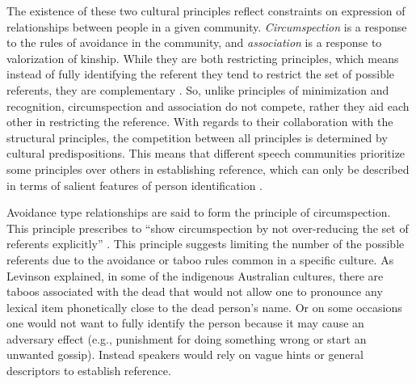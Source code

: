 \documentclass[12pt]{article}
\begin{document}
The existence of these two cultural principles reflect constraints on expression of relationships between people in a given community. \textit{Circumspection} is a response to the rules of avoidance in the community, and \textit{association} is a response to valorization of kinship. While they are both restricting principles, which means instead of fully identifying the referent they tend to restrict the set of possible referents, they are complementary \parencite{blythe2009}. So, unlike principles of minimization and recognition, circumspection and association do not compete, rather they aid each other in restricting the reference. With regards to their collaboration with the structural principles, the competition between all principles is determined by cultural predispositions. This means that different speech communities prioritize some principles over others in establishing reference, which can only be described in terms of salient features of person identification \parencite{enfield2013a}. 

Avoidance type relationships are said to form the principle of circumspection. This principle prescribes to ``show circumspection by not over-reducing the set of referents explicitly'' \parencite[p. 31]{levinson2007}. This principle suggests limiting the number of the possible referents due to the avoidance or taboo rules common in a specific culture. As Levinson explained, in some of the indigenous Australian cultures, there are taboos associated with the dead that would not allow one to pronounce any lexical item phonetically close to the dead person's name. Or on some occasions one would not want to fully identify the person because it may cause an adversary effect (e.g., punishment for doing something wrong or start an unwanted gossip). Instead speakers would rely on vague hints or general descriptors to establish reference. 
\end{document}
